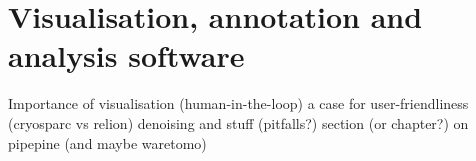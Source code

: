 \chapter{Visualisation, annotation and analysis software}

\begin{outline}
\1 Importance of visualisation (human-in-the-loop)
\1 a case for user-friendliness (cryosparc vs relion)
\1 denoising and stuff (pitfalls?)
\1 section (or chapter?) on pipepine (and maybe waretomo) 
\end{outline}
